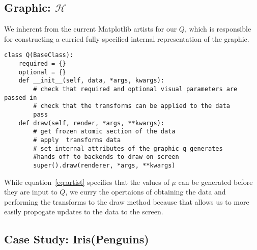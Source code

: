 \documentclass[../main.tex]{subfiles}
\begin{document}
\subsection{Graphic: $\mathcal{H}$}
We inherent from the current Matplotlib artists for our $Q$, which is responsible for constructing a curried fully specified internal representation of the graphic.
\begin{verbatim}
class Q(BaseClass):
    required = {}
    optional = {}
    def __init__(self, data, *args, kwargs):
        # check that required and optional visual parameters are passed in
        # check that the transforms can be applied to the data 
        pass
    def draw(self, render, *args, **kwargs):
        # get frozen atomic section of the data 
        # apply  transforms data
        # set internal attributes of the graphic q generates
        #hands off to backends to draw on screen
        super().draw(renderer, *args, **kwargs)
\end{verbatim}
While equation~\ref{eq:artist} specifies that the values of $\mu$ can be generated before they are input to $Q$, we curry the opertaions of obtaining the data and performing the transforms to the draw method because that allows us to more easily propogate updates to the data to the screen. 


\subsection{Case Study: Iris(Penguins)}
\end{document}
